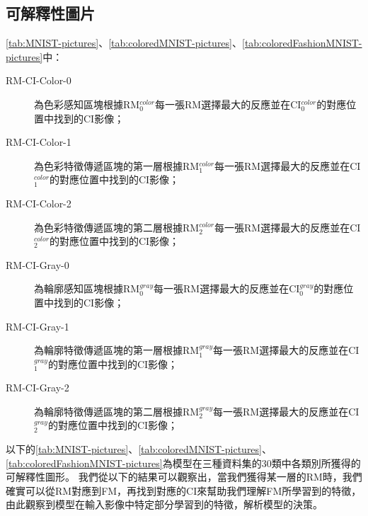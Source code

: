 \documentclass[class=NCU\_thesis, crop=false]{standalone}
\begin{document}
    \pagebreak
    \subsection{可解釋性圖片}
    \cref{tab:MNIST-pictures}、\cref{tab:coloredMNIST-pictures}、\cref{tab:coloredFashionMNIST-pictures}中：
    \begin{description}
        \item[RM-CI-Color-0] 為色彩感知區塊根據RM$^{color}_{0}$每一張RM選擇最大的反應並在CI$^{color}_{0}$的對應位置中找到的CI影像；
        \item[RM-CI-Color-1] 為色彩特徵傳遞區塊的第一層根據RM$^{color}_{1}$每一張RM選擇最大的反應並在CI$^{color}_{1}$的對應位置中找到的CI影像；
        \item[RM-CI-Color-2] 為色彩特徵傳遞區塊的第二層根據RM$^{color}_{2}$每一張RM選擇最大的反應並在CI$^{color}_{2}$的對應位置中找到的CI影像；

        \item[RM-CI-Gray-0] 為輪廓感知區塊根據RM$^{gray}_{0}$每一張RM選擇最大的反應並在CI$^{gray}_{0}$的對應位置中找到的CI影像；
        \item[RM-CI-Gray-1] 為輪廓特徵傳遞區塊的第一層根據RM$^{gray}_{1}$每一張RM選擇最大的反應並在CI$^{gray}_{1}$的對應位置中找到的CI影像；
        \item[RM-CI-Gray-2] 為輪廓特徵傳遞區塊的第二層根據RM$^{gray}_{2}$每一張RM選擇最大的反應並在CI$^{gray}_{2}$的對應位置中找到的CI影像；
    \end{description}
    以下的\cref{tab:MNIST-pictures}、\cref{tab:coloredMNIST-pictures}、\cref{tab:coloredFashionMNIST-pictures}為模型在三種資料集的30類中各類別所獲得的可解釋性圖形。
    我們從以下的結果可以觀察出，當我們獲得某一層的RM時，我們確實可以從RM對應到FM，再找到對應的CI來幫助我們理解FM所學習到的特徵，由此觀察到模型在輸入影像中特定部分學習到的特徵，解析模型的決策。
    \pagebreak
\end{document}
